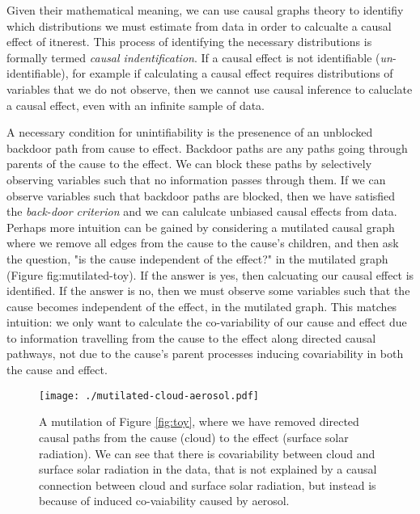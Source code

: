 \documentclass[12pt]{article}
\begin{document}

Given their mathematical meaning, we can use causal graphs theory
\citep[e.g.,][]{pearl1995causal,shpitser2006} to identifiy which
distributions we must estimate from data in order to calcualte a
causal effect of itnerest. This process of identifying the necessary
distributions is formally termed \emph{causal indentification}. If a
causal effect is not identifiable (\emph{un}-identifiable), for example if
calculating a causal effect requires distributions of variables that
we do not observe, then we cannot use causal inference to caluclate a
causal effect, even with an infinite sample of data.


A necessary condition for unintifiability is the presenence of an
unblocked backdoor path from cause to effect. Backdoor paths are any
paths going through parents of the cause to the effect. We can block
these paths by selectively observing variables such that no
information passes through them. If we can observe variables such that
backdoor paths are blocked, then we have satisfied the \emph{back-door
  criterion} and we can calulcate unbiased causal effects from
data. Perhaps more intuition can be gained by considering a mutilated
causal graph where we remove all edges from the cause to the cause's
children, and then ask the question, "is the cause independent of the
effect?" in the mutilated graph (Figure {fig:mutilated-toy}). If the
answer is yes, then calcuating our causal effect is identified. If the
answer is no, then we must observe some variables such that the cause
becomes independent of the effect, in the mutilated graph. This
matches intuition: we only want to calculate the co-variability of our
cause and effect due to information travelling from the cause to the
effect along directed causal pathways, not due to the cause's parent
processes inducing covariability in both the cause and effect.

\begin{figure}
 \noindent\texttt{[image: ./mutilated-cloud-aerosol.pdf]}\\
 \caption{A mutilation of Figure \ref{fig:toy}, where we have removed
   directed causal paths from the cause (cloud) to the effect (surface
   solar radiation). We can see that there is covariability between
   cloud and surface solar radiation in the data, that is not
   explained by a causal connection between cloud and surface solar
   radiation, but instead is because of induced co-vaiability caused
   by aerosol.}
 \label{fig:mutilated-toy}
\end{figure}
\end{document}
